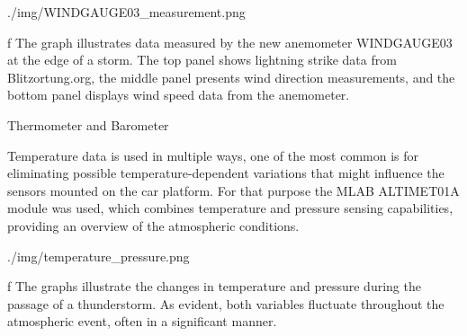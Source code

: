 \medskip
{}
\picw=15cm \cinspic ./img/WINDGAUGE03_measurement.png
\caption/f The graph illustrates data measured by the new anemometer WINDGAUGE03 at the edge of a storm. The top panel shows lightning strike data from Blitzortung.org, the middle panel presents wind direction measurements, and the bottom panel displays wind speed data from the anemometer.
\medskip

 
\secc Thermometer and Barometer

Temperature data is used in multiple ways, one of the most common is for eliminating possible temperature-dependent variations that might influence the sensors mounted on the car platform.  For that purpose the MLAB ALTIMET01A module was used, which combines temperature and pressure sensing capabilities, providing an overview of the atmospheric conditions. 

\medskip
{}
\picw=15cm \cinspic ./img/temperature_pressure.png
\caption/f  The graphs illustrate the changes in temperature and pressure during the passage of a thunderstorm. As evident, both variables fluctuate throughout the atmospheric event, often in a significant manner.
\medskip

